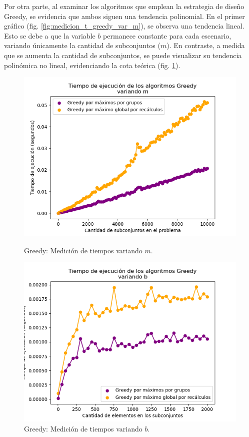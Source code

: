 Por otra parte, al examinar los algoritmos que emplean la estrategia de diseño Greedy, se evidencia que ambos siguen una tendencia polinomial. En el primer gráfico (fig. \ref{fig:medicion_t_greedy_var_m}), se observa una tendencia lineal. Esto se debe a que la variable $b$ permanece constante para cada escenario, variando únicamente la cantidad de subconjuntos ($m$). En contraste, a medida que se aumenta la cantidad de subconjuntos, se puede visualizar su tendencia polinómica no lineal, evidenciando la cota teórica (fig. \ref{fig:medicion_t_greedy_var_b}).

\begin{figure}[h]
    \centering
    \begin{minipage}{0.45\textwidth}
        \centering
        \includegraphics[width=\textwidth]{img/medicion_t_greedy_var_m.png}
        \caption{Greedy: Medición de tiempos variando $m$.}
        \label{fig:medicion_t_greedy_var_m}
    \end{minipage}\hfill
    \begin{minipage}{0.45\textwidth}
        \centering
        \includegraphics[width=\textwidth]{img/medicion_t_greedy_var_b.png}
        \caption{Greedy: Medición de tiempos variando $b$.}
        \label{fig:medicion_t_greedy_var_b}
    \end{minipage}
\end{figure}

